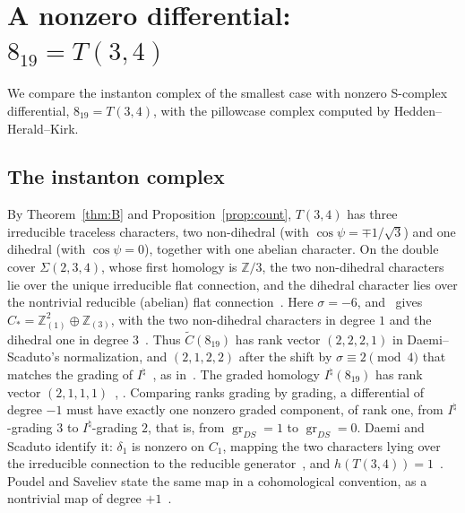 \documentclass[11pt,reqno]{amsart}
\theoremstyle{plain}
\theoremstyle{definition}
\newcommand{\Z}{\mathbb{Z}}
\newcommand{\Inat}{I^{\natural}}
\newcommand{\gr}{\operatorname{gr}}
\newcommand{\Sig}{\Sigma}
\begin{document}
\section{A nonzero differential: \texorpdfstring{$8_{19}=T(3,4)$}{8\_19 = T(3,4)}}\label{sec:819}

We compare the instanton complex of the smallest case with nonzero S-complex differential,
$8_{19}=T(3,4)$, with the pillowcase complex computed by Hedden--Herald--Kirk.

\subsection{The instanton complex}
By Theorem~\ref{thm:B} and Proposition~\ref{prop:count}, $T(3,4)$ has three irreducible traceless
characters, two non-dihedral (with $\cos\psi=\mp1/\sqrt3$) and one dihedral (with $\cos\psi=0$),
together with one abelian character. On the double cover $\Sig(2,3,4)$, whose first homology is $\Z/3$,
the two non-dihedral characters lie over the unique irreducible flat connection, and the dihedral
character lies over the nontrivial reducible (abelian) flat connection~\cite[\S9.1]{DSEquiv}. Here $\sigma=-6$,
and~\cite[Cor.~3]{DScaduto} gives $C_*=\Z^2_{(1)}\oplus\Z_{(3)}$, with the two non-dihedral characters in
degree $1$ and the dihedral one in degree $3$~\cite[\S9.4]{DSEquiv}. Thus $\widetilde C(8_{19})$ has rank
vector $(2,2,2,1)$ in Daemi--Scaduto's normalization, and $(2,1,2,2)$ after the shift by
$\sigma\equiv2\pmod4$ that matches the grading of $\Inat$~\cite[Thm.~8.9]{DSEquiv}, as
in~\cite[Ex.~7.9]{PS}. The graded homology $\Inat(8_{19})$ has rank vector $(2,1,1,1)$~\cite[\S12.2.3]{HHK1},
\cite[Ex.~7.8]{PS}. Comparing ranks grading by grading, a differential of degree $-1$ must have exactly
one nonzero graded component, of rank one, from $\Inat$-grading $3$ to $\Inat$-grading $2$, that is, from
$\gr_{DS}=1$ to $\gr_{DS}=0$. Daemi and Scaduto identify it: $\delta_1$ is nonzero on $C_1$, mapping the
two characters lying over the irreducible connection to the reducible generator~\cite[\S9.4]{DSEquiv},
and $h(T(3,4))=1$~\cite[Thm.~1.14(iii)]{DSEquiv}. Poudel and Saveliev state the same map in a
cohomological convention, as a nontrivial map of degree $+1$~\cite[Ex.~7.9]{PS}.
\end{document}
